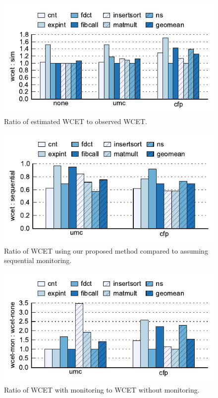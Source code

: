 \begin{figure}
  \begin{center}
    \includegraphics{monitoring_wcet/data/wcet-sim.pdf}
    \caption{Ratio of estimated WCET to observed WCET.}
    \label{fig:monitoring_wcet.evaluation.wcet-sim}
  \end{center}
\end{figure}
\begin{figure}
  \begin{center}
    \includegraphics{monitoring_wcet/data/wcet-sequential.pdf}
    \caption{Ratio of WCET using our proposed method compared to assuming
    sequential monitoring.}
    \label{fig:monitoring_wcet.evaluation.wcet-sequential}
  \end{center}
\end{figure}
\begin{figure}
  \begin{center}
    \includegraphics{monitoring_wcet/data/mon-none.pdf}
    \caption{Ratio of WCET with monitoring to WCET without monitoring.}
    \label{fig:monitoring_wcet.evaluation.mon-none}
  \end{center}
\end{figure}

